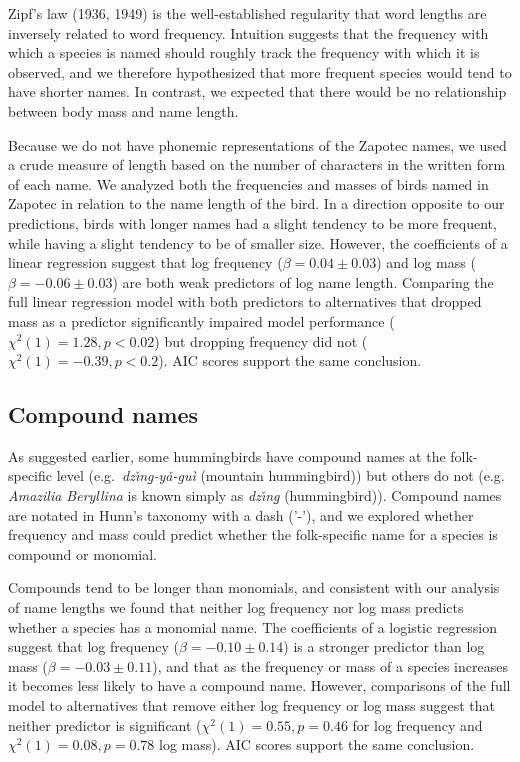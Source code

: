 \documentclass[10pt,letterpaper]{article}
\begin{document}
Zipf's law (1936, 1949)\nocite{zipf1936psycho,zipf1949human} is the well-established regularity that word lengths are inversely related to word frequency. Intuition suggests that the frequency with which a species is named should roughly track the frequency with which it is observed, and we therefore hypothesized that more frequent species would tend to have shorter names.  In contrast, we expected that there would be no relationship between body mass and name length. 

Because we do not have phonemic representations of the Zapotec names, we used a crude measure of length based on the number of characters in the written form of each name. We analyzed both the frequencies and masses of birds named in Zapotec in relation to the name length of the bird. In a direction opposite to our predictions, birds with longer names had a slight tendency to be more frequent, while having a slight tendency to be of smaller size. However, the coefficients of a linear regression suggest that log frequency ($\beta = 0.04 \pm 0.03$) and log mass ($\beta = -0.06 \pm 0.03$) are both weak predictors of log name length. Comparing the full linear regression model with both predictors to alternatives that dropped mass as a predictor significantly impaired model performance ($\chi^{2}(1) = 1.28, p < 0.02$) but dropping frequency did not ($\chi^{2}(1) = -0.39, p < 0.2$). AIC scores support the same conclusion.


\subsection{Compound names}

As suggested earlier, some hummingbirds have compound names at the folk-specific level (e.g.\ \textit{dz\v{\i}n\b{g}-y\v{a}-gu\`{i}} (mountain hummingbird)) but others do not (e.g.\   
\emph{ Amazilia Beryllina} is known simply as \textit{dz\v{\i}n\b{g}} (hummingbird)). Compound names are notated in Hunn's taxonomy with a dash ('-'), and we explored whether frequency and mass could predict whether the folk-specific name for a species is compound or monomial. 


Compounds tend to be longer than monomials, and consistent with our analysis of name lengths we found 
that neither log frequency nor log mass predicts whether a species has a monomial name. The coefficients of a logistic regression suggest that log frequency ($\beta = -0.10 \pm 0.14$) is a stronger predictor than log mass ($\beta = -0.03 \pm 0.11$), and that as the frequency or mass of a species increases it becomes less likely to have a compound name. However, comparisons of the full model to alternatives that remove either log frequency or log mass  suggest that neither predictor is significant ($\chi^{2}(1) = 0.55, p = 0.46$ for log frequency and $\chi^{2}(1) = 0.08, p = 0.78$ log mass).  AIC scores support the same conclusion. 
\end{document}
